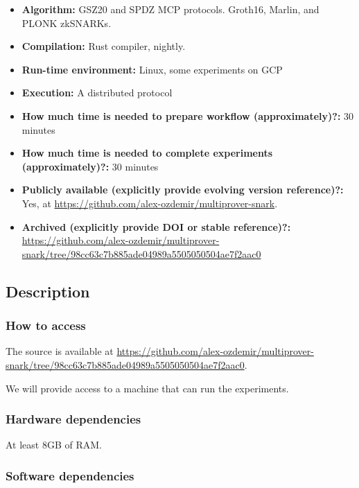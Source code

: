 \documentclass[letterpaper,twocolumn,10pt]{article}
\begin{document}
{\small
\begin{itemize}
  \item {\bf Algorithm: } GSZ20 and SPDZ MCP protocols. Groth16, Marlin, and
    PLONK zkSNARKs.
  \item {\bf Compilation: } Rust compiler, nightly.
  \item {\bf Run-time environment: } Linux, some experiments on GCP
  \item {\bf Execution: } A distributed protocol
  \item {\bf How much time is needed to prepare workflow (approximately)?: } 30
    minutes
  \item {\bf How much time is needed to complete experiments (approximately)?: }
    30 minutes
  \item {\bf Publicly available (explicitly provide evolving version
    reference)?: } Yes, at
    \url{https://github.com/alex-ozdemir/multiprover-snark}.
  \item {\bf Archived (explicitly provide DOI or stable reference)?: }
    \url{https://github.com/alex-ozdemir/multiprover-snark/tree/98cc63c7b885ade04989a5505050504ae7f2aac0}
\end{itemize}

\subsection{Description}

\subsubsection{How to access}

The source is available at
\url{https://github.com/alex-ozdemir/multiprover-snark/tree/98cc63c7b885ade04989a5505050504ae7f2aac0}.

We will provide access to a machine that can run the experiments.

\subsubsection{Hardware dependencies}

At least 8GB of RAM.

\subsubsection{Software dependencies}

}
\end{document}
